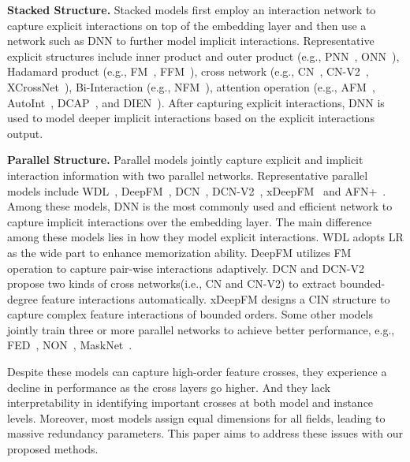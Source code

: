 \documentclass[sigconf]{acmart}
\begin{document}
\textbf{Stacked Structure.} Stacked models first employ an interaction network to capture explicit interactions on top of the embedding layer and then use a network such as DNN to further model implicit interactions. Representative explicit structures include inner product and outer product (e.g., PNN~\cite{qu2018product}, ONN~\cite{yang2020operation}), Hadamard product (e.g., FM~\cite{rendle2012factorization}, FFM~\cite{pan2018field}), cross network (e.g., CN~\cite{wang2017deep}, CN-V2~\cite{wang2021dcnm}, XCrossNet~\cite{yu2021xcrossnet}), Bi-Interaction (e.g., NFM~\cite{he2017neural}), attention operation (e.g., AFM~\cite{xiao2017attentional}, AutoInt~\cite{song2019autoint}, DCAP~\cite{chen2021dcap}, and DIEN~\cite{zhou2019dien}). After capturing explicit interactions, DNN is used to model deeper implicit interactions based on the explicit interactions output.

\textbf{Parallel Structure.} Parallel models jointly capture explicit and implicit interaction information with two parallel networks. Representative parallel models include WDL~\cite{cheng2016wide}, DeepFM~\cite{guo2017deepfm}, DCN~\cite{wang2017deep}, DCN-V2~\cite{wang2021dcnm}, xDeepFM~\cite{lian2018xdeepfm} and AFN+~\cite{cheng2020adaptive}. Among these models, DNN is the most commonly used and efficient network to capture implicit interactions over the embedding layer. The main difference among these models lies in how they model explicit interactions. WDL adopts LR as the wide part to enhance memorization ability. DeepFM utilizes FM~\cite{rendle2012factorization} operation to capture pair-wise interactions adaptively. DCN and DCN-V2 propose two kinds of cross networks(i.e., CN and CN-V2) to extract bounded-degree feature interactions automatically. xDeepFM designs a CIN structure to capture complex feature interactions of bounded orders. Some other models jointly train three or more parallel networks to achieve better performance, e.g., FED~\cite{zhao2020fed}, NON~\cite{luo2020network}, MaskNet~\cite{wang2021masknet}. 

Despite these models can capture high-order feature crosses, they experience a decline in performance as the cross layers go higher. And they lack interpretability in identifying important crosses at both model and instance levels. Moreover, most models assign equal dimensions for all fields, leading to massive redundancy parameters. This paper aims to address these issues with our proposed methods.
\end{document}
